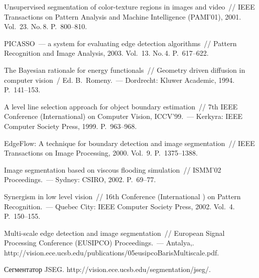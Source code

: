 \begin{multicols}{2}
  
  {\small\frenchspacing
{%
\begin{thebibliography}{99}
  
  Unsupervised segmentation of color-texture regions in images and video~// IEEE 
Transactions on Pattern Analysis and Machine Intelligence (PAMI'01), 2001. 
Vol.~23. No.\,8. P.~800--810.
  
  PICASSO~--- a system for evaluating edge detection algorithms~// Pattern 
Recognition and Image Analysis, 2003. Vol.~13. No.\,4. P.~617--622.

  The Bayesian rationale for energy functionals~// Geometry driven diffusion in 
computer vision~/ Ed. B.~Romeny.~--- Dordrecht: Kluwer Academic, 1994. 
P.~141--153.
  
  A level line selection approach for object boundary estimation~// 7th IEEE 
Conference (International) on Computer Vision, ICCV'99.~--- Kerkyra: IEEE 
Computer Society Press, 1999. P.~963--968.

  EdgeFlow: A technique for boundary detection and image segmentation~// IEEE 
Transactions on Image Processing, 2000. Vol.~9. P.~1375--1388.

  Image segmentation based on viscous flooding simulation~//  ISMM'02 Proceedings.~---  
Sydney: CSIRO, 2002. P.~69--77.
  
  Synergism in low level vision~// 16th Conference (International ) on Pattern 
Recognition.~--- Quebec City: IEEE Computer Society Press, 2002. Vol.~4. 
  P.~150--155.
  
  Multi-scale edge detection and image segmentation~//  European Signal Processing 
Conference (EUSIPCO) Proceedings.~--- Antalya,. {\sf 
http://vision.ece.ucsb.edu/publications/\linebreak 05eusipcoBarisMultiscale.pdf}.
  
  Сегментатор JSEG. {\sf http://vision.ece.ucsb.edu/\linebreak segmentation/jseg/}.
  

\end{thebibliography}}}
\end{multicols}

